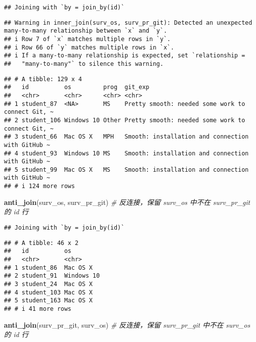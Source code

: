 \documentclass[
]{article}
\newenvironment{Shaded}{\begin{snugshade}}{\end{snugshade}}
\newcommand{\CommentTok}[1]{\textcolor[rgb]{0.56,0.35,0.01}{\textit{#1}}}
\newcommand{\FunctionTok}[1]{\textcolor[rgb]{0.13,0.29,0.53}{\textbf{#1}}}
\newcommand{\NormalTok}[1]{#1}
\begin{document}
\begin{verbatim}
## Joining with `by = join_by(id)`
\end{verbatim}

\begin{verbatim}
## Warning in inner_join(surv_os, surv_pr_git): Detected an unexpected many-to-many relationship between `x` and `y`.
## i Row 7 of `x` matches multiple rows in `y`.
## i Row 66 of `y` matches multiple rows in `x`.
## i If a many-to-many relationship is expected, set `relationship =
##   "many-to-many"` to silence this warning.
\end{verbatim}

\begin{verbatim}
## # A tibble: 129 x 4
##   id          os         prog  git_exp                                          
##   <chr>       <chr>      <chr> <chr>                                            
## 1 student_87  <NA>       MS    Pretty smooth: needed some work to connect Git, ~
## 2 student_106 Windows 10 Other Pretty smooth: needed some work to connect Git, ~
## 3 student_66  Mac OS X   MPH   Smooth: installation and connection with GitHub ~
## 4 student_93  Windows 10 MS    Smooth: installation and connection with GitHub ~
## 5 student_99  Mac OS X   MS    Smooth: installation and connection with GitHub ~
## # i 124 more rows
\end{verbatim}

\begin{Shaded}
\begin{Highlighting}[]
\FunctionTok{anti\_join}\NormalTok{(surv\_os, surv\_pr\_git)                                     }\CommentTok{\# 反连接，保留 surv\_os 中不在 surv\_pr\_git 的 id 行}
\end{Highlighting}
\end{Shaded}

\begin{verbatim}
## Joining with `by = join_by(id)`
\end{verbatim}

\begin{verbatim}
## # A tibble: 46 x 2
##   id          os        
##   <chr>       <chr>     
## 1 student_86  Mac OS X  
## 2 student_91  Windows 10
## 3 student_24  Mac OS X  
## 4 student_103 Mac OS X  
## 5 student_163 Mac OS X  
## # i 41 more rows
\end{verbatim}

\begin{Shaded}
\begin{Highlighting}[]
\FunctionTok{anti\_join}\NormalTok{(surv\_pr\_git, surv\_os)                                     }\CommentTok{\# 反连接，保留 surv\_pr\_git 中不在 surv\_os 的 id 行}
\end{Highlighting}
\end{Shaded}
\end{document}
